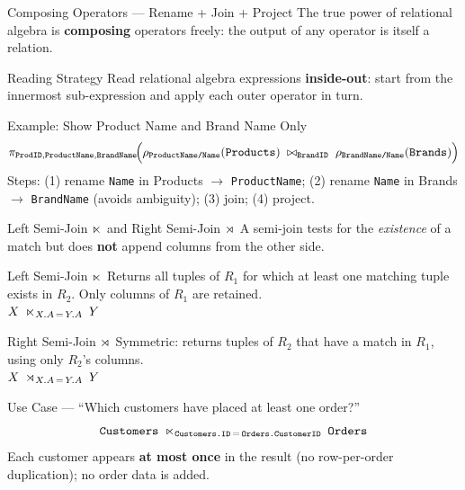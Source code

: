 \begin{frame}{Composing Operators --- Rename + Join + Project}
  The true power of relational algebra is \textbf{composing} operators freely:
  the output of any operator is itself a relation.

  \begin{block}{Reading Strategy}
    Read relational algebra expressions \textbf{inside-out}: start from the
    innermost sub-expression and apply each outer operator in turn.
  \end{block}

  \begin{examples}{Example: Show Product Name and Brand Name Only}
    \small
    \[
      \pi_{\texttt{ProdID},\texttt{ProductName},\texttt{BrandName}}\!\Bigl(
        \rho_{\texttt{ProductName/Name}}(\texttt{Products})
        \;\bowtie_{\texttt{BrandID}}\;
        \rho_{\texttt{BrandName/Name}}(\texttt{Brands})
      \Bigr)
    \]
    Steps: (1) rename \texttt{Name} in Products $\to$ \texttt{ProductName};
    (2) rename \texttt{Name} in Brands $\to$ \texttt{BrandName} (avoids
    ambiguity); (3) join; (4) project.
  \end{examples}
\end{frame}

\begin{frame}{Left Semi-Join $\ltimes$ and Right Semi-Join $\rtimes$}
  A semi-join tests for the \emph{existence} of a match but does \textbf{not}
  append columns from the other side.

  \begin{block}{Left Semi-Join $\ltimes$}
    Returns all tuples of $R_1$ for which at least one matching tuple exists in
    $R_2$.  Only columns of $R_1$ are retained.\\[2pt]
    $X \;\ltimes_{X.A\,=\,Y.A}\; Y$
  \end{block}

  \begin{block}{Right Semi-Join $\rtimes$}
    Symmetric: returns tuples of $R_2$ that have a match in $R_1$, using only
    $R_2$'s columns.\\[2pt]
    $X \;\rtimes_{X.A\,=\,Y.A}\; Y$
  \end{block}

  \begin{examples}{Use Case --- ``Which customers have placed at least one order?''}
    \[
      \texttt{Customers} \;\ltimes_{\texttt{Customers.ID}\,=\,\texttt{Orders.CustomerID}}\; \texttt{Orders}
    \]
    Each customer appears \textbf{at most once} in the result (no row-per-order
    duplication); no order data is added.
  \end{examples}
\end{frame}

